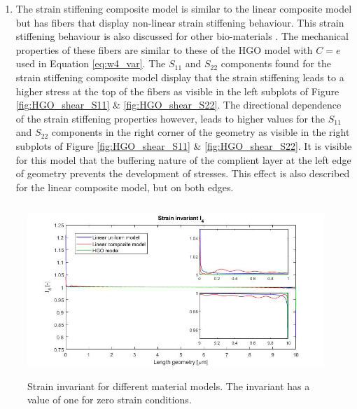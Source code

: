 \begin{enumerate}
    \item The strain stiffening composite model is similar to the linear composite model but has fibers that display non-linear strain stiffening behaviour. This strain stiffening behaviour is also discussed for other bio-materials \cite{holzapfel2000new}. The mechanical properties of these fibers are similar to these of the HGO model with $C = e$ used in Equation \ref{eq:w4_var}. The $S_{11}$ and $S_{22}$ components found for the strain stiffening composite model display that the strain stiffening leads to a higher stress at the top of the fibers as visible in the left subplots of Figure \ref{fig:HGO_shear_S11} \& \ref{fig:HGO_shear_S22}. The directional dependence of the strain stiffening properties however, leads to higher values for the $S_{11}$ and $S_{22}$ components in the right corner of the geometry as visible in the right subplots of Figure \ref{fig:HGO_shear_S11} \& \ref{fig:HGO_shear_S22}. It is visible for this model that the buffering nature of the complient layer at the left edge of geometry prevents the development of stresses. This effect is also described for the linear composite model, but on both edges. 
\end{enumerate}


\begin{figure}[h!]
\includegraphics[width=0.7\linewidth, height=6.5cm, angle=0]{images/HGO_model_validation/Invariant_i4.jpg}
\caption{Strain invariant for different material models. The invariant has a value of one for zero strain conditions.}
\label{fig:i4_invariant}
\end{figure}




